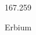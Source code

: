 \documentclass[12pt]{article}
\begin{document}
\hfill{}
\vfill
\begin{center}
  {\fontsize{50}{60}
  }

  167.259

Erbium
\end{center}
\vfill
\end{document}
